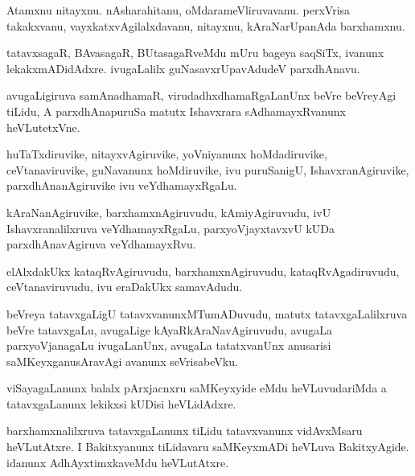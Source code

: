 \documentclass{article}
\begin{document}
\begin{mn}%
Atamxnu nitayxnu. nAsharahitanu, oMdarameVliruvavanu. perxVrisa
takakxvanu, vayxkatxvAgilalxdavanu, nitayxnu, kAraNarUpanAda barxhamxnu.
\end{mn}

\begin{mn}
tatavxsagaR, BAvasagaR, BUtasagaRveMdu mUru bageya saqSiTx, ivanunx
lekakxmADidAdxre. ivugaLalilx guNasavxrUpavAdudeV parxdhAnavu.
\end{mn}

\begin{mn}
avugaLigiruva samAnadhamaR, virudadhxdhamaRgaLanUnx beVre beVreyAgi
tiLidu, A parxdhAnapuruSa matutx Ishavxrara sAdhamayxRvanunx heVLutetxVne.
\end{mn}

\begin{mn}
huTaTxdiruvike, nitayxvAgiruvike, yoVniyanunx hoMdadiruvike,
ceVtanaviruvike, guNavanunx hoMdiruvike, ivu puruSanigU,
IshavxranAgiruvike, parxdhAnanAgiruvike ivu veYdhamayxRgaLu.
\end{mn}

\begin{mn}
kAraNanAgiruvike, barxhamxnAgiruvudu, kAmiyAgiruvudu, ivU
Ishavxranalilxruva veYdhamayxRgaLu, parxyoVjayxtavxvU kUDa
parxdhAnavAgiruva veYdhamayxRvu.
\end{mn}

\begin{mn}%
elAlxdakUkx kataqRvAgiruvudu, barxhamxnAgiruvudu, kataqRvAgadiruvudu,
ceVtanaviruvudu, ivu eraDakUkx samavAdudu.
\end{mn}

\begin{mn}
beVreya tatavxgaLigU tatavxvanunxMTumADuvudu, matutx
tatavxgaLalilxruva beVre tatavxgaLu, avugaLige kAyaRkAraNavAgiruvudu,
avugaLa parxyoVjanagaLu ivugaLanUnx, avugaLa tatatxvanUnx anusarisi
saMKeyxganusAravAgi avanunx seVrisabeVku.
\end{mn}

\begin{mn}
viSayagaLanunx balalx pArxjacnxru saMKeyxyide eMdu heVLuvudariMda a
tatavxgaLanunx lekikxsi kUDisi heVLidAdxre.
\end{mn}

\begin{mn}
barxhamxnalilxruva tatavxgaLanunx tiLidu tatavxvanunx vidAvxMsaru
heVLutAtxre. I Bakitxyanunx tiLidavaru saMKeyxmADi heVLuva
BakitxyAgide. idanunx AdhAyxtimxkaveMdu heVLutAtxre.
\end{mn}
\end{document}
